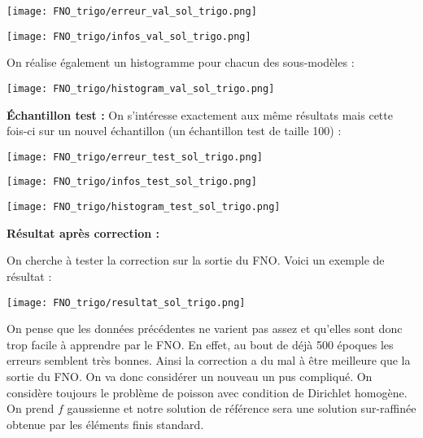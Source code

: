 \begin{minipage}{0.48\linewidth}
	\centering
	\texttt{[image: FNO\_trigo/erreur\_val\_sol\_trigo.png]}
\end{minipage}
\begin{minipage}{0.48\linewidth}
	\centering
	\texttt{[image: FNO\_trigo/infos\_val\_sol\_trigo.png]}
\end{minipage}

On réalise également un histogramme pour chacun des sous-modèles : 

\begin{minipage}{\linewidth}
	\centering
	\texttt{[image: FNO\_trigo/histogram\_val\_sol\_trigo.png]}
\end{minipage}

\newpage

\textbf{Échantillon test :}
On s'intéresse exactement aux même résultats mais cette fois-ci sur un nouvel échantillon (un échantillon test de taille 100) :

\begin{minipage}{0.48\linewidth}
	\centering
	\texttt{[image: FNO\_trigo/erreur\_test\_sol\_trigo.png]}
\end{minipage}
\begin{minipage}{0.48\linewidth}
	\centering
	\texttt{[image: FNO\_trigo/infos\_test\_sol\_trigo.png]}
\end{minipage}

\begin{minipage}{\linewidth}
	\centering
	\texttt{[image: FNO\_trigo/histogram\_test\_sol\_trigo.png]}
\end{minipage}

\textbf{Résultat après correction : }

On cherche à tester la correction sur la sortie du FNO. Voici un exemple de résultat :

\begin{minipage}{\linewidth}
	\centering
	\texttt{[image: FNO\_trigo/resultat\_sol\_trigo.png]}
\end{minipage}


On pense que les données précédentes ne varient pas assez et qu'elles sont donc trop facile à apprendre par le FNO. En effet, au bout de déjà 500 époques les erreurs semblent très bonnes. Ainsi la correction a du mal à être meilleure que la sortie du FNO. On va donc considérer un nouveau un pus compliqué. On considère toujours le problème de poisson avec condition de Dirichlet homogène. On prend $f$ gaussienne et notre solution de référence sera une solution sur-raffinée obtenue par les éléments finis standard.

